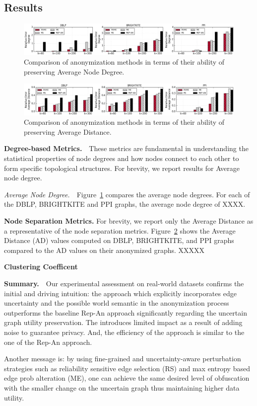 \subsection{Results}
\begin{figure}[!tb]
    \centering
    \includegraphics[width=\linewidth]{exp/ex_degree.eps}
    \caption{Comparison of anonymization methods in terms of their ability of preserving Average Node Degree.}
    \label{fig:ex_degree}
\end{figure}


\begin{figure}[!tb]
    \centering
    \includegraphics[width=\linewidth]{exp/ex_apd.eps}
    \caption{Comparison of anonymization methods in terms of their ability of preserving Average Distance.}
    \label{fig:ex_apd}
\end{figure}

\textbf{Degree-based Metrics.}~~These metrics are fundamental in understanding the statistical properties of node degrees and how nodes connect to each other to form specific topological structures. For brevity,  we report results  for  Average node degree. 

\emph{Average Node Degree.}~~Figure~\ref{fig:ex_degree} compares the average node degrees. For each of the DBLP, BRIGHTKITE and PPI graphs, the average node degree of XXXX. 


\textbf{Node Separation Metrics.} For brevity, we report only the Average Distance as a representative of the node separation metrics. 
Figure~\ref{fig:ex_apd} shows the Average Distance (AD) values computed on DBLP, BRIGHTKITE, and PPI graphs compared to the AD values on their anonymized graphs. 
XXXXX


\textbf{Clustering Coefficent}


\textbf{Summary.}~~Our experimental assessment on real-world datasets confirms the initial and driving intuition: the {\SysNameNS} approach which explicitly incorporates edge uncertainty and the possible world semantic in the anonymization process outperforms the baseline \textsf{Rep-An} approach significantly regarding the uncertain graph utility preservation. The {\SysNameNS} introduces limited impact as a result of adding noise to guarantee privacy. And, the efficiency of the {\SysNameNS} approach is similar to the one of the \textsf{Rep-An} approach. 

Another message is: by using fine-grained and uncertainty-aware perturbation strategies such as reliability sensitive edge selection (RS) and max entropy based edge prob alteration (ME), one can achieve the same desired level of obfuscation with the smaller change on the uncertain graph thus maintaining higher data utility. 




